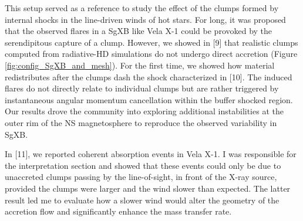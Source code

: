 \documentclass[letterpaper,12pt,onecolumn]{article}
\makeatletter
\newcommand{\sgx}{SgXB\xspace}
\newcommand*{\ns}{NS\@\xspace}
\makeatother
\begin{document}
This setup served as a reference to study the effect of the clumps formed by internal shocks in the line-driven winds of hot stars. For long, it was proposed that the observed flares in a \sgx like Vela X-1 could be provoked by the serendipitous capture of a clump. However, we showed in [9] that realistic clumps computed from radiative-HD simulations do not undergo direct accretion (Figure\,\,\ref{fig:config_SgXB_and_mesh}). For the first time, we showed how material redistributes after the clumps dash the shock characterized in [10]. The induced flares do not directly relate to individual clumps but are rather triggered by instantaneous angular momentum cancellation within the buffer shocked region. Our results drove the community into exploring additional instabilities at the outer rim of the \ns magnetosphere to reproduce the observed variability in \sgx.

In [11], we reported coherent absorption events in Vela X-1. I was responsible for the interpretation section and showed that these events could only be due to unaccreted clumps passing by the line-of-sight, in front of the X-ray source, provided the clumps were larger and the wind slower than expected. The latter result led me to evaluate how a slower wind would alter the geometry of the accretion flow and significantly enhance the mass transfer rate.
\end{document}
